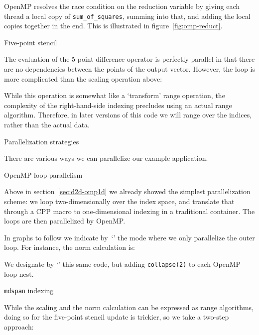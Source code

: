 OpenMP resolves the race condition on the reduction variable
by giving each thread a local copy of \lstinline{sum_of_squares},
summing into that, and adding the local copies together in the end.
This is illustrated in figure~\ref{fig:omp-reduct}.


 {Five-point stencil}
\label{sec:d2d-5pt}

The evaluation of the 5-point difference operator is perfectly parallel
in that there are no dependencies between the points of the output vector.
However, the loop is more complicated than the scaling operation above:
%

While this operation is somewhat like a `transform' range operation,
the complexity of the right-hand-side indexing precludes using
an actual range algorithm.
Therefore, in later versions of this code we will range over
the indices, rather than the actual data.


 {Parallelization strategies}

There are various ways we can parallelize our example application.

 {OpenMP loop parallelism}

Above in section~\ref{sec:d2d-omp1d}
we already showed the simplest parallelization scheme:
we loop two-dimensionally over the index space,
and translate that through a \ac{CPP} macro
to one-dimensional indexing in a traditional container.
The loops are then parallelized by OpenMP.

In graphs to follow we indicate by~`'
the mode where we only parallelize the outer loop.
For instance, the norm calculation is:
%

We designate by `' this same code, but adding
\lstinline{collapse(2)} to each OpenMP loop nest.

 {\texttt{mdspan} indexing}

While the scaling and the norm calculation can be expressed as range algorithms,
doing so for the five-point stencil update is trickier,
so we take a two-step approach:

